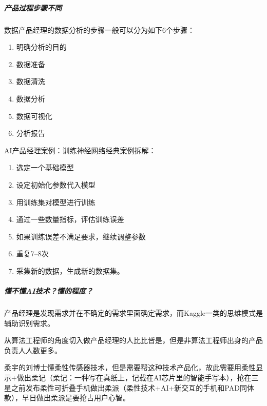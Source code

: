 \documentclass[letterpaper,11pt,english]{sphinxmanual}
\begin{document}
\subparagraph{产品过程步骤不同}
\label{\detokenize{chapter_introduction/AI_PM:id14}}
数据产品经理的数据分析的步骤一般可以分为如下6个步骤：
\begin{enumerate}
%
\item {} 
明确分析的目的

\item {} 
数据准备

\item {} 
数据清洗

\item {} 
数据分析

\item {} 
数据可视化

\item {} 
分析报告

\end{enumerate}

AI产品经理案例：训练神经网络经典案例拆解：
\begin{enumerate}
%
\item {} 
选定一个基础模型

\item {} 
设定初始化参数代入模型

\item {} 
用训练集对模型进行训练

\item {} 
通过一些数量指标，评估训练误差

\item {} 
如果训练误差不满足要求，继续调整参数

\item {} 
重复7–8次

\item {} 
采集新的数据，生成新的数据集。

\end{enumerate}


\subparagraph{懂不懂AI技术？懂的程度？}
\label{\detokenize{chapter_introduction/AI_PM:id15}}
产品经理是发现需求并在不确定的需求里面确定需求，而Kaggle一类的思维模式是辅助识别需求。

从算法工程师的角度切入做产品经理的人比比皆是，但是非算法工程师出身的产品负责人人数更多。

柔宇的刘博士懂柔性传感器技术，但是需要帮这种技术产品化，故此需要用柔性显示+做出柔记（柔记：一种写在真纸上，记载在AI芯片里的智能手写本），抢在三星之前发布柔性可折叠手机做出柔派（柔性技术+AI+新交互的手机和PAD同体款），早日做出柔派是要抢占用户心智。
\end{document}
